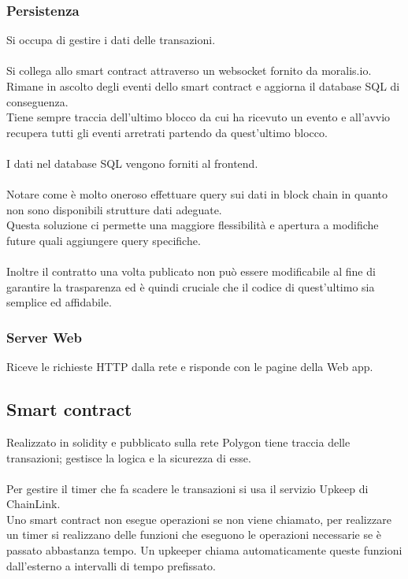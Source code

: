 \documentclass[a4paper, 12pt]{article}
\begin{document}
\subsubsection{Persistenza}
Si occupa di gestire i dati delle transazioni.\\\\
Si collega allo smart contract attraverso un websocket fornito da moralis.io.\\
Rimane in ascolto degli eventi dello smart contract e
aggiorna il database SQL di conseguenza.\\
Tiene sempre traccia dell'ultimo blocco da cui ha ricevuto un evento
e all'avvio recupera tutti gli eventi arretrati partendo da quest'ultimo blocco.\\\\
I dati nel database SQL vengono forniti al frontend.\\\\
Notare come è molto oneroso
effettuare query sui dati in block chain in quanto non sono disponibili strutture dati adeguate.\\
Questa soluzione ci permette una maggiore flessibilità e apertura a modifiche future quali aggiungere query specifiche.\\\\
Inoltre il contratto una volta publicato non può essere modificabile al fine di garantire la trasparenza ed è quindi cruciale
che il codice di quest'ultimo sia semplice ed affidabile.
\subsubsection{Server Web}
Riceve le richieste HTTP dalla rete e risponde con le pagine della Web app.

\subsection{Smart contract}
Realizzato in solidity e pubblicato sulla rete Polygon tiene traccia delle transazioni; gestisce la logica e la sicurezza di esse.\\\\
Per gestire il timer che fa scadere le transazioni si usa il servizio Upkeep di ChainLink.\\
Uno smart contract non esegue operazioni se non viene chiamato, per realizzare un timer si realizzano delle funzioni che
eseguono le operazioni necessarie se è passato abbastanza tempo. Un upkeeper chiama automaticamente queste funzioni dall'esterno a intervalli di tempo prefissato.
\end{document}
